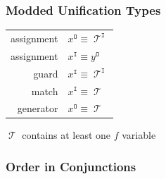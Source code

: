 \documentclass[xcolor=table, aspectratio=169]{beamer}
\DeclareMathOperator{\Term}{\mathcal{T}}
\DeclareMathOperator{\inmode}{\mathtt{I}}
\DeclareMathOperator{\outmode}{\mathtt{O}}
\begin{document}
\begin{frame}[fragile]
  \frametitle{Modded Unification Types}

\begin{center}
\begin{tabular}{rl}
  assignment & $x^{\outmode} \equiv \Term^{\inmode} $ \\
  assignment & $x^{\inmode}  \equiv y^{\outmode}    $ \\
  guard      & $x^{\inmode}  \equiv \Term^{\inmode} $ \\
  match      & $x^{\inmode}  \equiv \Term           $ \\
  generator  & $x^{\outmode} \equiv \Term           $
\end{tabular}
\end{center}

\hfill \footnotesize $\Term$ contains at least one $f$ variable
\end{frame}



\begin{frame}[fragile]
  \frametitle{Order in Conjunctions}

\end{frame}


%     
%     






%     
%     
\end{document}
